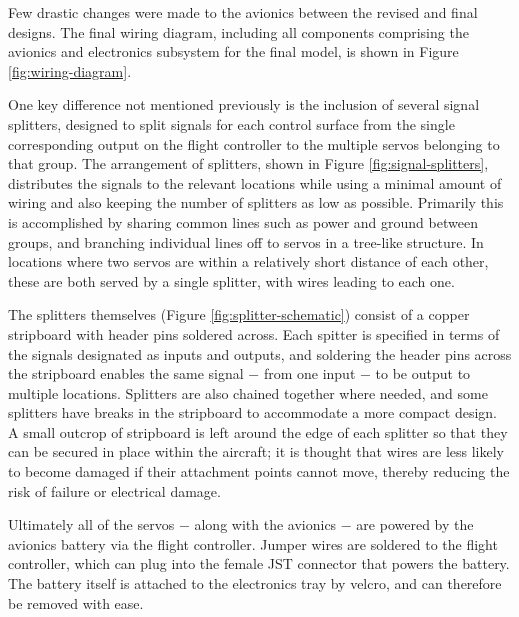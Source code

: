 \documentclass[../../main.tex]{subfiles}
\begin{document}
Few drastic changes were made to the avionics between the revised and final designs.
The final wiring diagram, including all components comprising the avionics and electronics subsystem for the final model, is shown in Figure \ref{fig:wiring-diagram}.


One key difference not mentioned previously is the inclusion of several signal splitters, designed to split signals for each control surface from the single corresponding output on the flight controller to the multiple servos belonging to that group.
The arrangement of splitters, shown in Figure \ref{fig:signal-splitters}, distributes the signals to the relevant locations while using a minimal amount of wiring and also keeping the number of splitters as low as possible.
Primarily this is accomplished by sharing common lines such as power and ground between groups, and branching individual lines off to servos in a tree-like structure.
In locations where two servos are within a relatively short distance of each other, these are both served by a single splitter, with wires leading to each one.

The splitters themselves (Figure \ref{fig:splitter-schematic}) consist of a copper stripboard with header pins soldered across.
Each spitter is specified in terms of the signals designated as inputs and outputs, and soldering the header pins across the stripboard enables the same signal $-$ from one input $-$ to be output to multiple locations.
Splitters are also chained together where needed, and some splitters have breaks in the stripboard to accommodate a more compact design.
A small outcrop of stripboard is left around the edge of each splitter so that they can be secured in place within the aircraft; it is thought that wires are less likely to become damaged if their attachment points cannot move, thereby reducing the risk of failure or electrical damage.


Ultimately all of the servos $-$ along with the avionics $-$ are powered by the avionics battery via the flight controller.
Jumper wires are soldered to the flight controller, which can plug into the female JST connector that powers the battery.
The battery itself is attached to the electronics tray by velcro, and can therefore be removed with ease.
\end{document}
